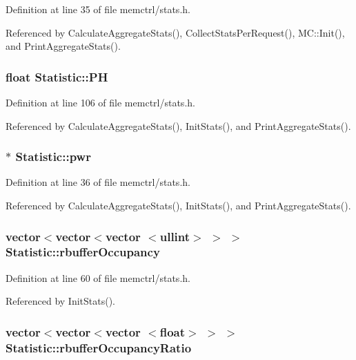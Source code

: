 Definition at line 35 of file memctrl/stats.h.

Referenced by CalculateAggregateStats(), CollectStatsPerRequest(), MC::Init(), and PrintAggregateStats().
\subsubsection[{PH}]{\setlength{\rightskip}{0pt plus 5cm}float {\bf Statistic::PH}}\label{classStatistic_cbdacc4684c25de2953e9dbf5a37eaaa}




Definition at line 106 of file memctrl/stats.h.

Referenced by CalculateAggregateStats(), InitStats(), and PrintAggregateStats().
\subsubsection[{pwr}]{$\ast$ {\bf Statistic::pwr}}\label{classStatistic_efe7c14b6732f868396167424fde5a9f}




Definition at line 36 of file memctrl/stats.h.

Referenced by CalculateAggregateStats(), InitStats(), and PrintAggregateStats().
\subsubsection[{rbufferOccupancy}]{\setlength{\rightskip}{0pt plus 5cm}vector$<$vector$<$vector $<${\bf ullint}$>$ $>$ $>$ {\bf Statistic::rbufferOccupancy}}\label{classStatistic_3fe99aa69677f448afff5906d714741b}




Definition at line 60 of file memctrl/stats.h.

Referenced by InitStats().
\subsubsection[{rbufferOccupancyRatio}]{\setlength{\rightskip}{0pt plus 5cm}vector$<$vector$<$vector $<$float$>$ $>$ $>$ {\bf Statistic::rbufferOccupancyRatio}}\label{classStatistic_96446d15d3c4e9c8d236b95cd0f47d24}





